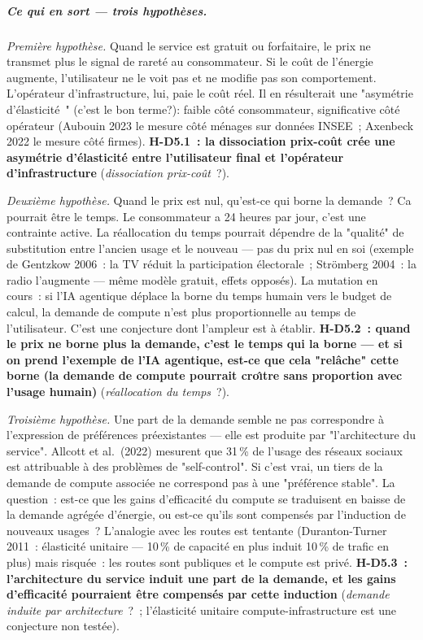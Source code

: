 \subparagraph{Ce qui en sort --- trois hypoth\`eses.}

\emph{Premi\`ere hypoth\`ese.} Quand le service est gratuit ou forfaitaire, le prix ne transmet plus le signal de raret\'e au consommateur. Si le co\^ut de l'\'energie augmente, l'utilisateur ne le voit pas et ne modifie pas son comportement. L'op\'erateur d'infrastructure, lui, paie le co\^ut r\'eel. Il en r\'esulterait une "asym\'etrie d'\'elasticit\'e~" (c'est le bon terme?): faible c\^ot\'e consommateur, significative c\^ot\'e op\'erateur (Aubouin 2023 le mesure c\^ot\'e m\'enages sur donn\'ees INSEE~; Axenbeck 2022 le mesure c\^ot\'e firmes). \textbf{H-D5.1~: la dissociation prix-co\^ut cr\'ee une asym\'etrie d'\'elasticit\'e entre l'utilisateur final et l'op\'erateur d'infrastructure} (\emph{dissociation prix-co\^ut}~?).

\emph{Deuxi\`eme hypoth\`ese.} Quand le prix est nul, qu'est-ce qui borne la demande~? Ca pourrait être le temps. Le consommateur a 24 heures par jour, c'est une contrainte active. La r\'eallocation du temps pourrait  d\'ependre de la "qualit\'e" de substitution entre l'ancien usage et le nouveau --- pas du prix nul en soi (exemple de Gentzkow 2006~: la TV r\'eduit la participation \'electorale~; Str\"omberg 2004~: la radio l'augmente --- m\^eme mod\`ele gratuit, effets oppos\'es). La mutation en cours~: si l'IA agentique d\'eplace la borne du temps humain vers le budget de calcul, la demande de compute n'est plus proportionnelle au temps de l'utilisateur. C'est une conjecture dont l'ampleur est \`a \'etablir. \textbf{H-D5.2~: quand le prix ne borne plus la demande, c'est le temps qui la borne --- et si on prend l'exemple de l'IA agentique, est-ce que cela "rel\^ache" cette borne (la demande de compute pourrait cro\^{\i}tre sans proportion avec l'usage humain)} (\emph{r\'eallocation du temps}~?).

\emph{Troisi\`eme hypoth\`ese.} Une part de la demande semble ne pas correspondre \`a l'expression de pr\'ef\'erences pr\'eexistantes --- elle est produite par "l'architecture du service". Allcott et al.~(2022) mesurent que 31\,\% de l'usage des r\'eseaux sociaux est attribuable \`a des probl\`emes de "self-control". Si c'est vrai, un tiers de la demande de compute associ\'ee ne correspond pas \`a une "pr\'ef\'erence stable". La question~: est-ce que les gains d'efficacit\'e du compute se traduisent en baisse de la demande agr\'eg\'ee d'\'energie, ou est-ce qu'ils sont compens\'es par l'induction de nouveaux usages~? L'analogie avec les routes est tentante (Duranton-Turner 2011~: \'elasticit\'e unitaire --- 10\,\% de capacit\'e en plus induit 10\,\% de trafic en plus) mais risqu\'ee~: les routes sont publiques et le compute est priv\'e. \textbf{H-D5.3~: l'architecture du service induit une part de la demande, et les gains d'efficacit\'e pourraient \^etre compens\'es par cette induction} (\emph{demande induite par architecture}~?~; l'\'elasticit\'e unitaire compute-infrastructure est une conjecture non test\'ee).

